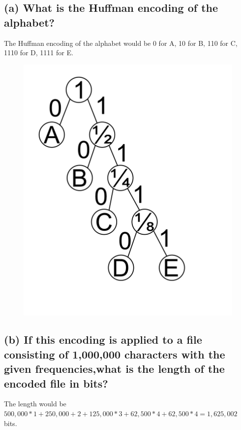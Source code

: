 \documentclass[10pt,letterpaper]{article}
\begin{document}
\subsection*{(a) What is the Huffman encoding of the alphabet?}
The Huffman encoding of the alphabet would be 0 for A, 10 for B, 110 for C, 1110 for D, 1111 for E. 
\begin{figure}[h!]
\centering
\includegraphics[width=0.4\textheight]{"5.19 Huffman Tree.png"}
\end{figure}
\subsection*{(b) If this encoding is applied to a file consisting of 1,000,000 characters with the given frequencies,what is the length of the encoded file in bits?}
The length would be $500,000 * 1 + 250,000 + 2 + 125,000 * 3 + 62,500 * 4 + 62,500 * 4 = 1,625,002$ bits. 
\end{document}

